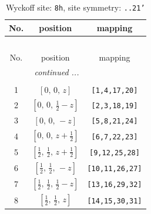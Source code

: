 \documentclass[fleqn,8pt]{jsarticle}
\begin{document}
\begin{longtable}{ccc}
\caption{Wyckoff site: {\tt 8h}, site symmetry: {\tt ..21'}}
 \\
 \hline \hline
No. & position & mapping \\ \hline \endfirsthead

\multicolumn{2}{l}{\tablename\ \thetable{}} \\
 \hline \hline
No. & position & mapping \\ \hline \endhead

 \hline \hline
\multicolumn{2}{r}{\footnotesize\it continued ...} \\ \endfoot

 \hline \hline
\multicolumn{2}{r}{} \\ \endlastfoot

1 & $\left[ 0,\, 0,\, z \right]$ & {\tt [1,4,17,20]} \\ \hline
2 & $\left[ 0,\, 0,\, \frac{1}{2} - z \right]$ & {\tt [2,3,18,19]} \\ \hline
3 & $\left[ 0,\, 0,\, - z \right]$ & {\tt [5,8,21,24]} \\ \hline
4 & $\left[ 0,\, 0,\, z + \frac{1}{2} \right]$ & {\tt [6,7,22,23]} \\ \hline
5 & $\left[ \frac{1}{2},\, \frac{1}{2},\, z + \frac{1}{2} \right]$ & {\tt [9,12,25,28]} \\ \hline
6 & $\left[ \frac{1}{2},\, \frac{1}{2},\, - z \right]$ & {\tt [10,11,26,27]} \\ \hline
7 & $\left[ \frac{1}{2},\, \frac{1}{2},\, \frac{1}{2} - z \right]$ & {\tt [13,16,29,32]} \\ \hline
8 & $\left[ \frac{1}{2},\, \frac{1}{2},\, z \right]$ & {\tt [14,15,30,31]} \\
\end{longtable}
\renewcommand{\arraystretch}{1.2}
\end{document}
